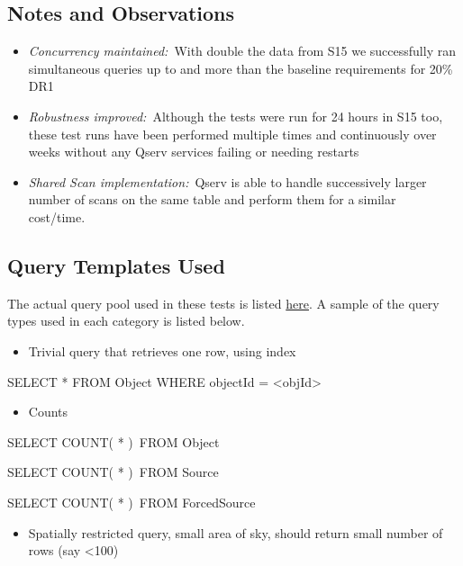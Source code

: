 \subsection{Notes and Observations}\label{notes-and-observations}

\begin{itemize}
\item
  \emph{Concurrency maintained:}~With double the data from S15 we
  successfully ran simultaneous queries up to and more than the baseline
  requirements for 20\% DR1
\item
  \emph{Robustness improved:}~Although the tests were run for 24 hours
  in S15 too, these test runs have been performed multiple times and
  continuously over weeks without any Qserv services failing or needing
  restarts
\item
  \emph{Shared Scan implementation:}~Qserv is able to handle
  successively larger number of scans on the same table and perform them
  for a similar cost/time.~
\end{itemize}

\subsection{Query Templates Used}\label{query-templates-used}

The actual query pool used in these tests is listed
\href{file:////download/attachments/54854103/query_pools.txt\%3fversion=1\&modificationDate=1494281645000\&api=v2}{here}.
A sample of the query types used in each category is listed below.

\begin{itemize}
\item
  Trivial query that retrieves one row, using index
\end{itemize}

SELECT * FROM Object WHERE objectId = \textless{}objId\textgreater{}

\begin{itemize}
\item
  Counts
\end{itemize}

SELECT COUNT( * )~FROM Object

SELECT COUNT( * )~FROM Source

SELECT COUNT( * )~FROM ForcedSource

\begin{itemize}
\item
  Spatially restricted query, small area of sky, should return small
  number of rows (say \textless{}100)
\end{itemize}

